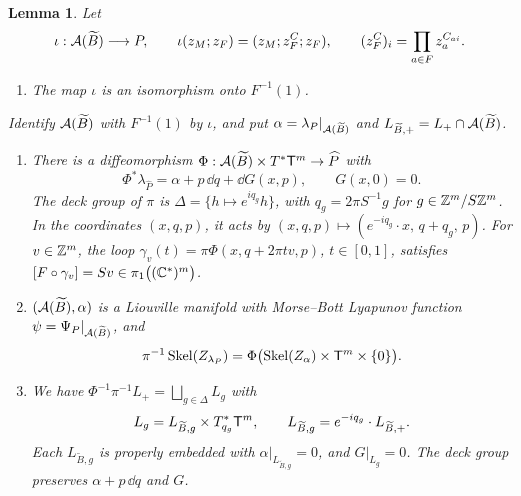 \documentclass[12pt, letter]{amsart}
\newtheorem{lemma}[dummy]{Lemma}
\theoremstyle{definition}
\begin{document}
\begin{lemma}\label{lem:phase-cover}
Let
\[
 \iota:\mathcal{A}(\widetilde B)\longrightarrow P,\qquad \iota(z_M;z_F)=(z_M;z_F^C;z_F),\qquad (z_F^C)_i=\prod_{a\in F}z_a^{C_{ai}}.
\]
\begin{enumerate}[label=\textup{(\roman*)}]
\item The map $\iota$ is an isomorphism onto $F^{-1}(1)$.
\end{enumerate}
Identify $\mathcal{A}(\widetilde B)$ with $F^{-1}(1)$ by $\iota$, and put $\alpha=\lambda_P|_{\mathcal{A}(\widetilde B)}$ and $L_{\widetilde B,+}=L_+\cap\mathcal{A}(\widetilde B)$.
\begin{enumerate}[label=\textup{(\roman*)},resume]
\item There is a diffeomorphism $\Phi:\mathcal{A}(\widetilde B)\times T^*\mathsf T^m\to\widehat P$ with
\[
 \Phi^*\lambda_{\widehat P}=\alpha+p\,\dd q+\dd G(x,p),\qquad G(x,0)=0 .
\]
The deck group of $\pi$ is $\Delta=\{h\mapsto e^{iq_g}h\}$, with $q_g=2\pi S^{-1}g$ for $g\in\mathbb{Z}^m/S\mathbb{Z}^m$.
In the coordinates $(x,q,p)$, it acts by $(x,q,p)\mapsto(e^{-iq_g}\cdot x,\,q+q_g,\,p)$.
For $v\in\mathbb{Z}^m$, the loop $\gamma_v(t)=\pi\Phi(x,q+2\pi tv,p)$, $t\in[0,1]$, satisfies $[F\circ\gamma_v]=Sv\in\pi_1\bigl((\mathbb{C}^*)^m\bigr)$.
\item $(\mathcal{A}(\widetilde B),\alpha)$ is a Liouville manifold with Morse--Bott Lyapunov function $\psi=\Psi_P|_{\mathcal{A}(\widetilde B)}$, and
\[
 \pi^{-1}\operatorname{Skel}(Z_{\lambda_P})=\Phi\bigl(\operatorname{Skel}(Z_\alpha)\times\mathsf T^m\times\{0\}\bigr).
\]
\item We have $\Phi^{-1}\pi^{-1}L_+=\bigsqcup_{g\in\Delta}L_g$ with
\[
 L_g=L_{\widetilde B,g}\times T^*_{q_g}\mathsf T^m,\qquad L_{\widetilde B,g}=e^{-iq_g}\cdot L_{\widetilde B,+} .
\]
Each $L_{\widetilde B,g}$ is properly embedded with $\alpha|_{L_{\widetilde B,g}}=0$, and $G|_{L_g}=0$.
The deck group preserves $\alpha+p\,\dd q$ and $G$.
\end{enumerate}
\end{lemma}
\end{document}
